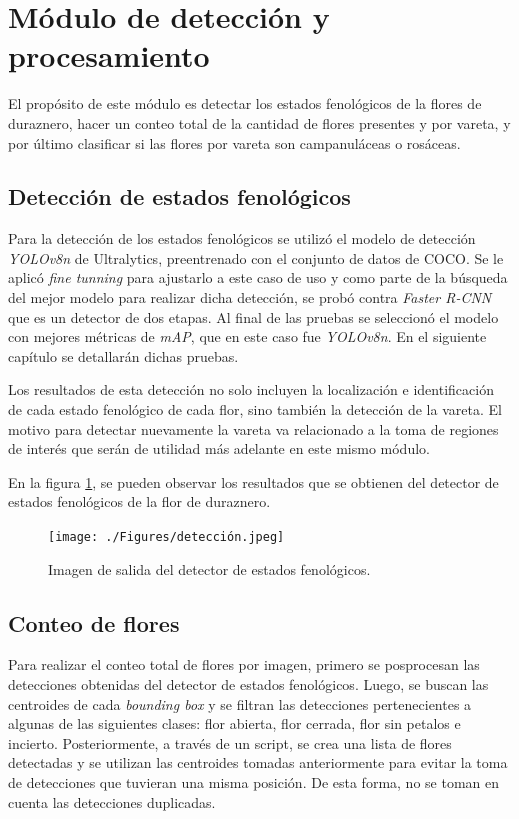 \section{Módulo de detección y procesamiento}

El propósito de este módulo es detectar los estados fenológicos de la flores de duraznero, hacer un conteo total de la cantidad de flores presentes y por vareta, y por último clasificar si las flores por vareta son campanuláceas o rosáceas.

\subsection{Detección de estados fenológicos}

Para la detección de los estados fenológicos se utilizó el modelo de detección \textit{YOLOv8n} de Ultralytics, preentrenado con el conjunto de datos de COCO. Se le aplicó \textit{fine tunning} para ajustarlo a este caso de uso y como parte de la búsqueda del mejor modelo para realizar dicha detección, se probó contra \textit{Faster R-CNN} que es un detector de dos etapas. Al final de las pruebas se seleccionó el modelo con mejores métricas de \textit{mAP}, que en este caso fue \textit{YOLOv8n}. En el siguiente capítulo se detallarán dichas pruebas.

Los resultados de esta detección no solo incluyen la localización e identificación de cada estado fenológico de cada flor, sino también la detección de la vareta. El motivo para detectar nuevamente la vareta va relacionado a la toma de regiones de interés que serán de utilidad más adelante en este mismo módulo.  

En la figura \ref{fig:deteccionEjem}, se pueden observar los resultados que se obtienen del detector de estados fenológicos de la flor de duraznero.

\begin{figure}[ht]
	\centering
	\texttt{[image: ./Figures/detección.jpeg]}
	\caption{Imagen de salida del detector de estados fenológicos.}
	\label{fig:deteccionEjem}
\end{figure}

\subsection{Conteo de flores}

Para realizar el conteo total de flores por imagen, primero se posprocesan las detecciones obtenidas del detector de estados fenológicos. Luego, se buscan las centroides de cada \textit{bounding box} y se filtran las detecciones pertenecientes a algunas de las siguientes clases: flor abierta, flor cerrada, flor sin petalos e incierto. Posteriormente, a través de un script, se crea una lista de flores detectadas y se utilizan las centroides tomadas anteriormente para evitar la toma de detecciones que tuvieran una misma posición. De esta  forma, no se toman en cuenta las detecciones duplicadas.

